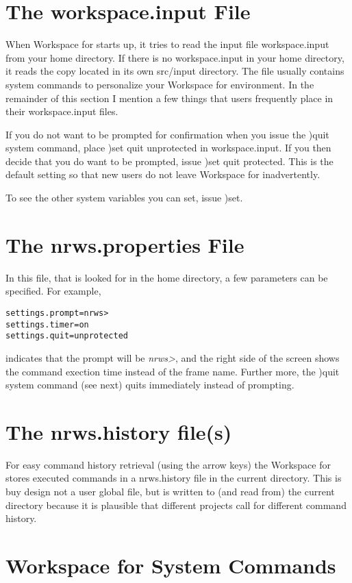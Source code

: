 \section{The workspace.input File}

When Workspace for \nr{} starts up, it tries to read the input file workspace.input from your home directory. If there is no workspace.input in your home directory, it reads the copy located in its own src/input directory. The file usually contains system commands to personalize your Workspace for \nr{} environment. In the remainder of this section I mention a few things that users frequently place in their workspace.input files.

If you do not want to be prompted for confirmation when you issue the )quit system command, place )set quit unprotected in workspace.input. If you then decide that you do want to be prompted, issue )set quit protected. This is the default setting so that new users do not leave Workspace for \nr{} inadvertently.

To see the other system variables you can set, issue )set.


\section{The nrws.properties File}

In this file, that is looked for in the home directory, a few
parameters can be specified. For example,
\begin{verbatim}
settings.prompt=nrws>
settings.timer=on
settings.quit=unprotected
\end{verbatim}
indicates that the prompt will be \emph{nrws>}, and the right side of
the screen shows the command exection time instead of the frame
name. Further more, the )quit system command (see next) quits
immediately instead of prompting.

\section{The nrws.history file(s)}

For easy command history retrieval (using the arrow keys) the
Workspace for \nr{} stores executed commands in a nrws.history file
in the current directory. This is buy design not a user global file,
but is written to (and read from) the current directory because it is
plausible that different projects call for different command history.

\section{Workspace for \nr{} System Commands}


